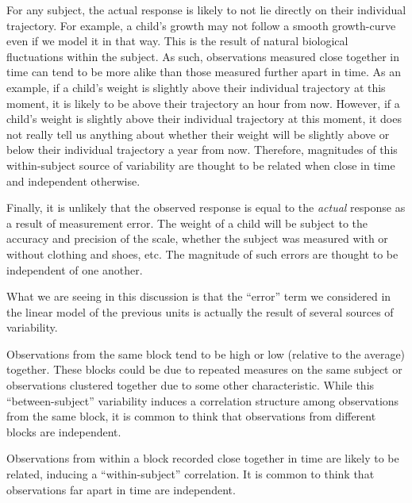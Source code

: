 \documentclass[
  letterpaper,
  DIV=11,
  numbers=noendperiod]{scrreprt}
\theoremstyle{definition}
\theoremstyle{definition}
\theoremstyle{remark}
\begin{document}
For any subject, the actual response is likely to not lie directly on
their individual trajectory. For example, a child's growth may not
follow a smooth growth-curve even if we model it in that way. This is
the result of natural biological fluctuations within the subject. As
such, observations measured close together in time can tend to be more
alike than those measured further apart in time. As an example, if a
child's weight is slightly above their individual trajectory at this
moment, it is likely to be above their trajectory an hour from now.
However, if a child's weight is slightly above their individual
trajectory at this moment, it does not really tell us anything about
whether their weight will be slightly above or below their individual
trajectory a year from now. Therefore, magnitudes of this within-subject
source of variability are thought to be related when close in time and
independent otherwise.

Finally, it is unlikely that the observed response is equal to the
\emph{actual} response as a result of measurement error. The weight of a
child will be subject to the accuracy and precision of the scale,
whether the subject was measured with or without clothing and shoes,
etc. The magnitude of such errors are thought to be independent of one
another.

What we are seeing in this discussion is that the ``error'' term we
considered in the linear model of the previous units is actually the
result of several sources of variability.

\begin{tcolorbox}[enhanced jigsaw, left=2mm, toprule=.15mm, arc=.35mm, breakable, opacitybacktitle=0.6, opacityback=0, rightrule=.15mm, colbacktitle=quarto-callout-tip-color!10!white, coltitle=black, leftrule=.75mm, toptitle=1mm, colframe=quarto-callout-tip-color-frame, titlerule=0mm, title=\textcolor{quarto-callout-tip-color}{\faLightbulb}\hspace{0.5em}{Big Idea}, bottomrule=.15mm, colback=white, bottomtitle=1mm]

Observations from the same block tend to be high or low (relative to the
average) together. These blocks could be due to repeated measures on the
same subject or observations clustered together due to some other
characteristic. While this ``between-subject'' variability induces a
correlation structure among observations from the same block, it is
common to think that observations from different blocks are independent.

Observations from within a block recorded close together in time are
likely to be related, inducing a ``within-subject'' correlation. It is
common to think that observations far apart in time are independent.

\end{tcolorbox}
\end{document}
